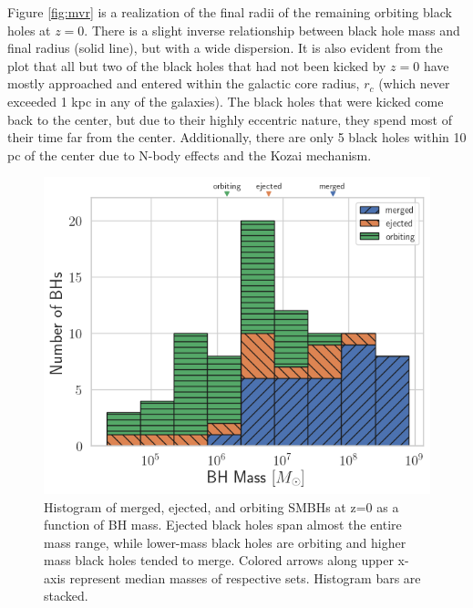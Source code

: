 \documentclass[fleqn,usenatbib,useAMS]{mnras}
\begin{document}
Figure \ref{fig:mvr} is a realization of the final radii of the remaining orbiting black holes at $z=0$.  There is a slight inverse relationship between black hole mass and final radius (solid line), but with a wide dispersion.  It is also evident from the plot that all but two of the black holes that had not been kicked by $z=0$ have mostly approached and entered within the galactic core radius, $r_c$ (which never exceeded 1 kpc in any of the galaxies).  The black holes that were kicked come back to the center, but due to their highly eccentric nature, they spend most of their time far from the center.  Additionally, there are only 5 black holes within 10 pc of the center due to N-body effects and the Kozai mechanism.

\begin{figure}
\begin{center}
\includegraphics[width=1.0\columnwidth]{plots/Summary_Results_All_Galaxies.png}
\caption{Histogram of merged, ejected, and orbiting SMBHs at z=0 as a function of BH mass.  Ejected black holes span almost the entire mass range, while lower-mass black holes are orbiting and higher mass black holes tended to merge.  Colored arrows along upper x-axis represent median masses of respective sets.  Histogram bars are stacked.}
\label{fig:meosmbh}
\end{center}
\end{figure}
\end{document}
